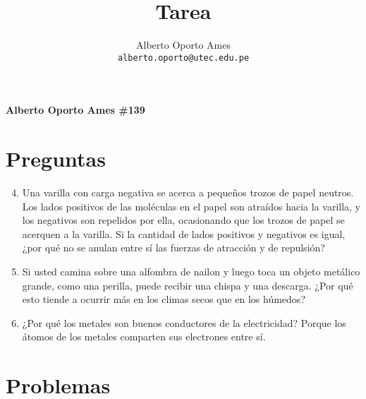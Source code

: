\documentclass[12pt, twoside]{article}
\title{\textbf{Tarea}}
\author{
		Alberto Oporto Ames\\
		\texttt{alberto.oporto@utec.edu.pe}\\
		}
\begin{document}
\textbf{Alberto Oporto Ames \#139}
\thispagestyle{fancy}

\section{Preguntas}%
\label{sec:Preguntas}

\begin{enumerate}
	\setcounter{enumi}{3}
	\item Una varilla con carga negativa se acerca a pequeños trozos de papel neutros.
		Los lados positivos de las moléculas en el papel son atraídos hacia la varilla,
		y los negativos son repelidos por ella,
		ocasionando que los trozos de papel se acerquen a la varilla.
		Si la cantidad de lados positivos y negativos es igual,
		¿por qué no se anulan entre sí las fuerzas de atracción y de repulsión?

	\item Si usted camina sobre una alfombra de nailon y luego toca un objeto metálico grande,
		como una perilla, puede recibir una chispa y una descarga.
		¿Por qué esto tiende a ocurrir más en los climas secos que en los húmedos?

	\item ¿Por qué los metales son buenos conductores de la electricidad?
		\subitem Porque los átomos de los metales comparten sus electrones entre sí.
\end{enumerate}
\section{Problemas}%
\label{sec:Problemas}
\end{document}
